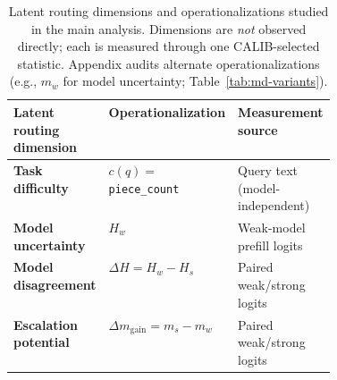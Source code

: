 \begin{table}[t]
  \centering
  \small
  \setlength{\tabcolsep}{5pt}
  \begin{tabular}{@{}llp{0.42\linewidth}@{}}
    \toprule
    \textbf{Latent routing dimension} & \textbf{Operationalization} & \textbf{Measurement source} \\
    \midrule
    \textbf{Task difficulty} &
    $c(q)=$ \texttt{piece\_count} &
    Query text (model-independent) \\
    \addlinespace
    \textbf{Model uncertainty} &
    $H_w$ &
    Weak-model prefill logits \\
    \addlinespace
    \textbf{Model disagreement} &
    $\Delta H = H_w - H_s$ &
    Paired weak/strong logits \\
    \addlinespace
    \textbf{Escalation potential} &
    $\Delta m_{\mathrm{gain}} = m_s - m_w$ &
    Paired weak/strong logits \\
    \bottomrule
  \end{tabular}
  \caption{Latent routing dimensions and operationalizations studied in the main analysis. Dimensions are \emph{not} observed directly; each is measured through one CALIB-selected statistic. Appendix audits alternate operationalizations (e.g., $m_w$ for model uncertainty; Table~\ref{tab:md-variants}).}
  \label{tab:dimensions}
\end{table}
